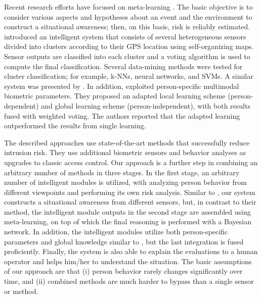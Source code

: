 Recent research efforts have focused on meta-learning \citep{Brazdil2009, Vilalta02, Wang1997}. The basic objective is to consider various aspects and hypotheses about an event and the environment to construct a situational awareness;  then, on this basis, risk is reliably estimated. \citet{lamborn2006} introduced an intelligent system that consists of several heterogeneous sensors divided into clusters according to their GPS location using self-organizing maps. Sensor outputs are classified into each cluster and a voting algorithm is used to compute the final classification. Several data-mining methods were tested for cluster classification; for example, k-NNs, neural networks, and SVMs. A similar system was presented by \citet{Bontempi2005}. In addition, \citet{Fierrez-Aguilar2005} exploited person-specific multimodal biometric parameters. They proposed an adapted local learning scheme (person-de\-pen\-dent) and global learning scheme (person-in\-de\-pendent), with both results fused with weighted voting. The authors reported that the adapted learning outperformed the results from single learning.


The described approaches use state-of-the-art methods that successfully reduce intrusion risk. They use additional biometric sensors and behavior analyses as upgrades to classic access control. Our approach is a further step in combining an arbitrary number of methods in three stages. In the first stage, an arbitrary number of intelligent modules is utilized, with analyzing person behavior from different viewpoints and performing its own risk analysis. Similar to \citet{lamborn2006}, our system constructs a situational awareness from different sensors, but, in contrast to their method, the intelligent module outputs in the second stage are assembled using meta-learning, on top of which the final reasoning is performed with a Bayesian network. In addition, the intelligent modules utilize both person-specific parameters and global knowledge similar to \citet{Fierrez-Aguilar2005}, but the last integration is fused proficiently. Finally, the system is also able to explain the evaluations to a human operator and helps him/her to understand the situation. The basic assumptions of our approach are that (i) person behavior rarely changes significantly over time, and (ii) combined methods are much harder to bypass than a single sensor or method.



